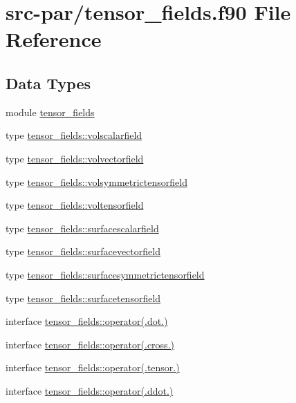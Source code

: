 \hypertarget{tensor__fields_8f90}{\section{src-\/par/tensor\-\_\-fields.f90 File Reference}
\label{tensor__fields_8f90}
}
\subsection*{Data Types}
\begin{DoxyCompactItemize}
\item 
module \hyperlink{classtensor__fields}{tensor\-\_\-fields}
\item 
type \hyperlink{structtensor__fields_1_1volscalarfield}{tensor\-\_\-fields\-::volscalarfield}
\item 
type \hyperlink{structtensor__fields_1_1volvectorfield}{tensor\-\_\-fields\-::volvectorfield}
\item 
type \hyperlink{structtensor__fields_1_1volsymmetrictensorfield}{tensor\-\_\-fields\-::volsymmetrictensorfield}
\item 
type \hyperlink{structtensor__fields_1_1voltensorfield}{tensor\-\_\-fields\-::voltensorfield}
\item 
type \hyperlink{structtensor__fields_1_1surfacescalarfield}{tensor\-\_\-fields\-::surfacescalarfield}
\item 
type \hyperlink{structtensor__fields_1_1surfacevectorfield}{tensor\-\_\-fields\-::surfacevectorfield}
\item 
type \hyperlink{structtensor__fields_1_1surfacesymmetrictensorfield}{tensor\-\_\-fields\-::surfacesymmetrictensorfield}
\item 
type \hyperlink{structtensor__fields_1_1surfacetensorfield}{tensor\-\_\-fields\-::surfacetensorfield}
\item 
interface \hyperlink{interfacetensor__fields_1_1operator_07_8dot_8_08}{tensor\-\_\-fields\-::operator(.\-dot.)}
\item 
interface \hyperlink{interfacetensor__fields_1_1operator_07_8cross_8_08}{tensor\-\_\-fields\-::operator(.\-cross.)}
\item 
interface \hyperlink{interfacetensor__fields_1_1operator_07_8tensor_8_08}{tensor\-\_\-fields\-::operator(.\-tensor.)}
\item 
interface \hyperlink{interfacetensor__fields_1_1operator_07_8ddot_8_08}{tensor\-\_\-fields\-::operator(.\-ddot.)}
\item 

\end{DoxyCompactItemize}
